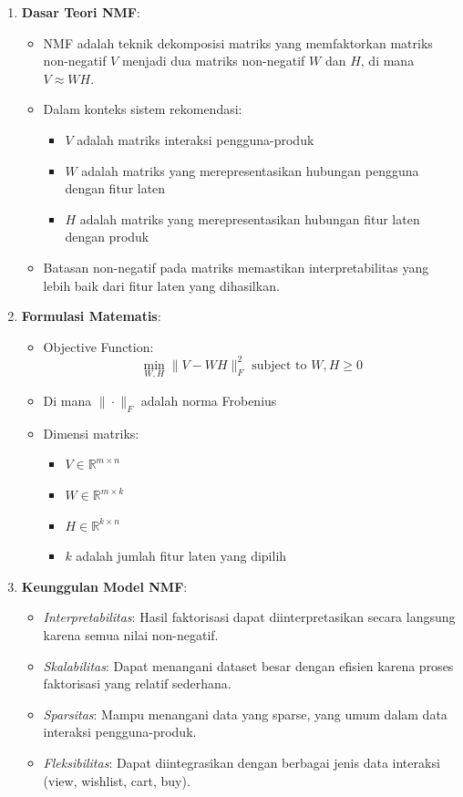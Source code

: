 \documentclass[journal,article,submit,pdftex,moreauthors]{Definitions/mdpi}
\begin{document}
\begin{enumerate}
    \item \textbf{Dasar Teori NMF}:
    \begin{itemize}
        \item NMF adalah teknik dekomposisi matriks yang memfaktorkan matriks non-negatif \(V\) menjadi dua matriks non-negatif \(W\) dan \(H\), di mana \(V \approx WH\).
        \item Dalam konteks sistem rekomendasi:
        \begin{itemize}
            \item \(V\) adalah matriks interaksi pengguna-produk
            \item \(W\) adalah matriks yang merepresentasikan hubungan pengguna dengan fitur laten
            \item \(H\) adalah matriks yang merepresentasikan hubungan fitur laten dengan produk
        \end{itemize}
        \item Batasan non-negatif pada matriks memastikan interpretabilitas yang lebih baik dari fitur laten yang dihasilkan.
    \end{itemize}

    \item \textbf{Formulasi Matematis}:
    \begin{itemize}
        \item Objective Function:
        \[
        \min_{W,H} \|V - WH\|_F^2 \text{ subject to } W,H \geq 0
        \]
        \item Di mana \(\|\cdot\|_F\) adalah norma Frobenius
        \item Dimensi matriks:
        \begin{itemize}
            \item \(V \in \mathbb{R}^{m \times n}\)
            \item \(W \in \mathbb{R}^{m \times k}\)
            \item \(H \in \mathbb{R}^{k \times n}\)
            \item \(k\) adalah jumlah fitur laten yang dipilih
        \end{itemize}
    \end{itemize}

    \item \textbf{Keunggulan Model NMF}:
    \begin{itemize}
        \item \textit{Interpretabilitas}: Hasil faktorisasi dapat diinterpretasikan secara langsung karena semua nilai non-negatif.
        \item \textit{Skalabilitas}: Dapat menangani dataset besar dengan efisien karena proses faktorisasi yang relatif sederhana.
        \item \textit{Sparsitas}: Mampu menangani data yang sparse, yang umum dalam data interaksi pengguna-produk.
        \item \textit{Fleksibilitas}: Dapat diintegrasikan dengan berbagai jenis data interaksi (view, wishlist, cart, buy).
    \end{itemize}


\end{enumerate}
\end{document}
